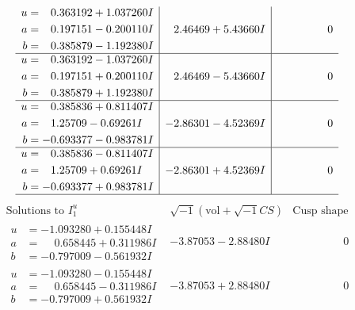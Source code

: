 \documentclass[1p]{elsarticle_modified}
\theoremstyle{definition}
\newcommand{\I}{\sqrt{-1}}
\begin{document}
$$\begin{array}{c|c|c}
\begin{aligned}
u &= \phantom{-}0.363192 + 1.037260 I \\
a &= \phantom{-}0.197151 - 0.200110 I \\
b &= \phantom{-}0.385879 - 1.192380 I\end{aligned}
 & \phantom{-}2.46469 + 5.43660 I & \phantom{-0.000000 } 0 \\ \hline\begin{aligned}
u &= \phantom{-}0.363192 - 1.037260 I \\
a &= \phantom{-}0.197151 + 0.200110 I \\
b &= \phantom{-}0.385879 + 1.192380 I\end{aligned}
 & \phantom{-}2.46469 - 5.43660 I & \phantom{-0.000000 } 0 \\ \hline\begin{aligned}
u &= \phantom{-}0.385836 + 0.811407 I \\
a &= \phantom{-}1.25709 - 0.69261 I \\
b &= -0.693377 - 0.983781 I\end{aligned}
 & -2.86301 - 4.52369 I & \phantom{-0.000000 } 0 \\ \hline\begin{aligned}
u &= \phantom{-}0.385836 - 0.811407 I \\
a &= \phantom{-}1.25709 + 0.69261 I \\
b &= -0.693377 + 0.983781 I\end{aligned}
 & -2.86301 + 4.52369 I & \phantom{-0.000000 } 0\\
 \hline 
 \end{array}$$\newpage$$\begin{array}{c|c|c}  
\text{Solutions to }I^u_{1}& \I (\text{vol} + \sqrt{-1}CS) & \text{Cusp shape}\\
 \hline 
\begin{aligned}
u &= -1.093280 + 0.155448 I \\
a &= \phantom{-}0.658445 + 0.311986 I \\
b &= -0.797009 - 0.561932 I\end{aligned}
 & -3.87053 - 2.88480 I & \phantom{-0.000000 } 0 \\ \hline\begin{aligned}
u &= -1.093280 - 0.155448 I \\
a &= \phantom{-}0.658445 - 0.311986 I \\
b &= -0.797009 + 0.561932 I\end{aligned}
 & -3.87053 + 2.88480 I & \phantom{-0.000000 } 0 \\ \hline\begin{aligned}

\end{aligned}
\end{array}$$
\end{document}
